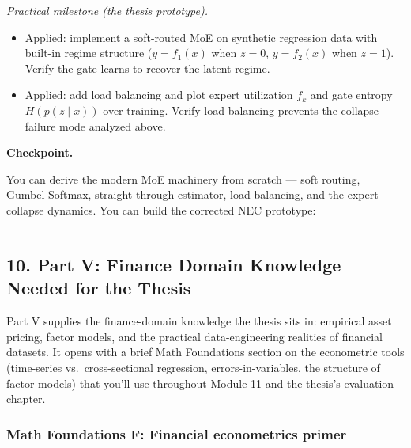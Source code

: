 \emph{Practical milestone (the thesis prototype).}

\begin{itemize}
\tightlist
\item
  Applied: implement a soft-routed MoE on synthetic regression data with
  built-in regime structure (\(y = f_1(x)\) when \(z = 0\),
  \(y = f_2(x)\) when \(z = 1\)). Verify the gate learns to recover the
  latent regime.
\item
  Applied: add load balancing and plot expert utilization \(f_k\) and
  gate entropy \(H(p(z \mid x))\) over training. Verify load balancing
  prevents the collapse failure mode analyzed above.
\end{itemize}

\textbf{Checkpoint.}

You can derive the modern MoE machinery from scratch --- soft routing,
Gumbel-Softmax, straight-through estimator, load balancing, and the
expert-collapse dynamics. You can build the corrected NEC prototype:

\begin{Shaded}
\begin{Highlighting}[]
\end{Highlighting}
\end{Shaded}

\begin{center}\rule{0.5\linewidth}{0.5pt}\end{center}

\subsection{10. Part V: Finance Domain Knowledge Needed for the
Thesis}\label{part-v-finance-domain-knowledge-needed-for-the-thesis}

Part V supplies the finance-domain knowledge the thesis sits in:
empirical asset pricing, factor models, and the practical
data-engineering realities of financial datasets. It opens with a brief
Math Foundations section on the econometric tools (time-series
vs.~cross-sectional regression, errors-in-variables, the structure of
factor models) that you'll use throughout Module 11 and the thesis's
evaluation chapter.

\subsubsection{Math Foundations F: Financial econometrics
primer}\label{math-foundations-f-financial-econometrics-primer}

